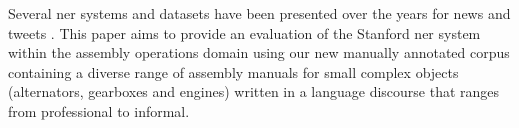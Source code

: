 Several \gls{ner} systems and datasets have been presented over the years for news and tweets \cite{Dojchinovski2013,Roder2014}. This paper aims to provide an evaluation of the Stanford \gls{ner} system within the assembly operations domain using our new manually annotated corpus containing a diverse range of assembly manuals for small complex objects (alternators, gearboxes and engines) written in a language discourse that ranges from professional to informal.
